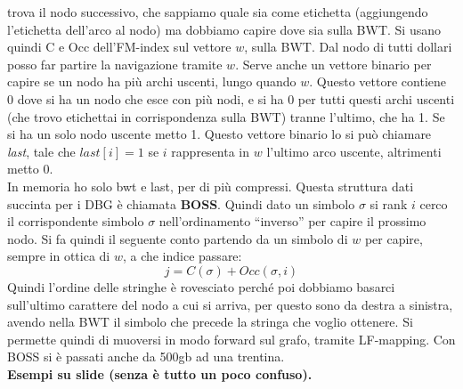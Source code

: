 \documentclass[a4paper,12pt, oneside]{book}
\begin{document}
trova il nodo successivo, che sappiamo quale sia come etichetta (aggiungendo
l'etichetta dell'arco al nodo) ma dobbiamo capire dove sia sulla BWT. Si usano
quindi C e Occ dell'FM-index sul vettore $w$, sulla BWT. Dal nodo di tutti
dollari posso far partire la navigazione tramite $w$. Serve anche un vettore
binario per capire se un nodo ha più archi uscenti, lungo quando $w$. Questo
vettore contiene 0 dove si ha un nodo che esce con più nodi, e si ha 0 per tutti
questi archi uscenti (che trovo etichettai in corrispondenza sulla BWT) tranne
l'ultimo, che ha 1. Se si ha un solo nodo uscente 
metto 1. Questo vettore binario lo si può chiamare \textit{last}, tale che
$last[i]=1$ se $i$ rappresenta in $w$ l'ultimo arco uscente, altrimenti metto
0.\\
In memoria ho solo bwt e last, per di più compressi. Questa struttura dati
succinta per i DBG è chiamata \textbf{BOSS}. Quindi dato un simbolo $\sigma$ si
rank $i$ cerco il corrispondente simbolo $\sigma$ nell'ordinamento ``inverso''
per capire il prossimo nodo. Si fa quindi il seguente conto partendo da un
simbolo di $w$ per capire, sempre in ottica di $w$, a che indice passare:
\[j=C(\sigma)+Occ(\sigma, i)\]
Quindi l'ordine delle stringhe è rovesciato perché poi dobbiamo basarci
sull'ultimo carattere del nodo a cui si arriva, per questo sono da destra a
sinistra, avendo nella BWT il simbolo che precede la stringa che voglio
ottenere. Si permette quindi di muoversi in modo forward sul grafo, tramite 
LF-mapping. Con BOSS si è passati anche da 500gb ad una trentina.\\ 
\textbf{Esempi su slide (senza è tutto un poco confuso).}
\end{document}
